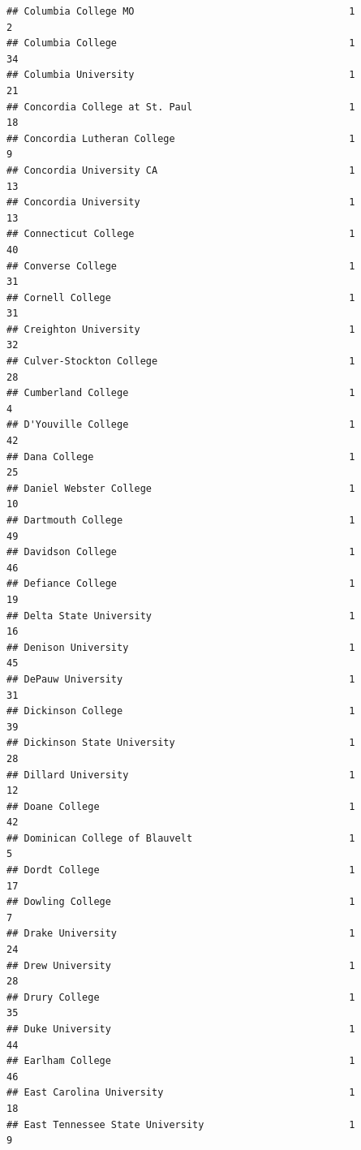 \documentclass[
]{article}
\begin{document}
\begin{verbatim}
## Columbia College MO                                     1           2
## Columbia College                                        1          34
## Columbia University                                     1          21
## Concordia College at St. Paul                           1          18
## Concordia Lutheran College                              1           9
## Concordia University CA                                 1          13
## Concordia University                                    1          13
## Connecticut College                                     1          40
## Converse College                                        1          31
## Cornell College                                         1          31
## Creighton University                                    1          32
## Culver-Stockton College                                 1          28
## Cumberland College                                      1           4
## D'Youville College                                      1          42
## Dana College                                            1          25
## Daniel Webster College                                  1          10
## Dartmouth College                                       1          49
## Davidson College                                        1          46
## Defiance College                                        1          19
## Delta State University                                  1          16
## Denison University                                      1          45
## DePauw University                                       1          31
## Dickinson College                                       1          39
## Dickinson State University                              1          28
## Dillard University                                      1          12
## Doane College                                           1          42
## Dominican College of Blauvelt                           1           5
## Dordt College                                           1          17
## Dowling College                                         1           7
## Drake University                                        1          24
## Drew University                                         1          28
## Drury College                                           1          35
## Duke University                                         1          44
## Earlham College                                         1          46
## East Carolina University                                1          18
## East Tennessee State University                         1           9

\end{verbatim}
\end{document}
